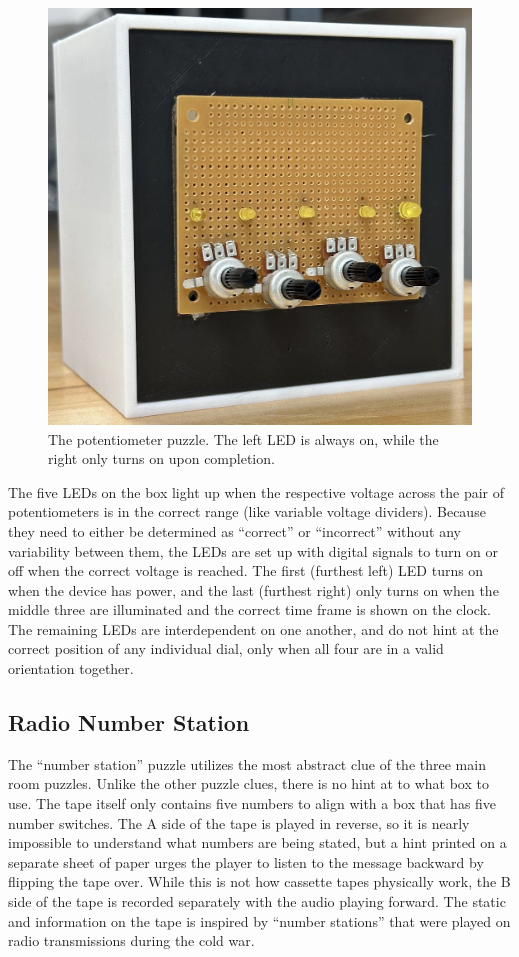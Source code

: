 \documentclass[conference]{IEEEtran}
\begin{document}
\begin{figure}[ht]
    \centering
    \includegraphics[width=0.90\columnwidth]{Images/pot_puzzle.jpg}
    \caption{The potentiometer puzzle. The left LED is always on, while the right only turns on upon completion.}
\end{figure}

\indent The five LEDs on the box light up when the respective voltage across the pair of potentiometers is in the 
correct range (like variable voltage dividers). Because they need to either be determined as ``correct'' or ``incorrect'' 
without any variability between them, the LEDs are set up with digital signals to turn on or off when the correct voltage is 
reached. The first (furthest left) LED turns on when the device has power, and the last (furthest right) only turns on when 
the middle three are illuminated and the correct time frame is shown on the clock. The remaining LEDs are interdependent on one 
another, and do not hint at the correct position of any individual dial, only when all four are in a valid orientation together.


\subsection{Radio Number Station}
The ``number station'' puzzle utilizes the most abstract clue of the three main room puzzles. Unlike the other puzzle clues, 
there is no hint at to what box to use. The tape itself only contains five numbers to align with a box that has five number 
switches. The A side of the tape is played in reverse, so it is nearly impossible to understand what numbers are being stated, 
but a hint printed on a separate sheet of paper urges the player to listen to the message backward by flipping the tape over. 
While this is not how cassette tapes physically work, the B side of the tape is recorded separately with the audio playing 
forward. The static and information on the tape is inspired by “number stations” that were played on radio transmissions during 
the cold war. 
\end{document}
